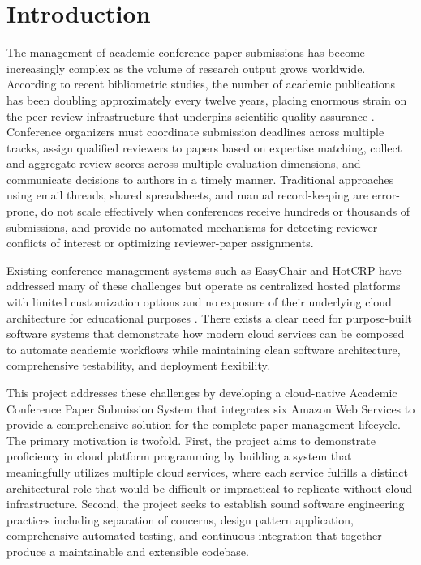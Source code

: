 \documentclass[conference]{IEEEtran}
\begin{document}
\section{Introduction}

The management of academic conference paper submissions has become increasingly complex as the volume of research output grows worldwide. According to recent bibliometric studies, the number of academic publications has been doubling approximately every twelve years, placing enormous strain on the peer review infrastructure that underpins scientific quality assurance \cite{bornmann2015growth}. Conference organizers must coordinate submission deadlines across multiple tracks, assign qualified reviewers to papers based on expertise matching, collect and aggregate review scores across multiple evaluation dimensions, and communicate decisions to authors in a timely manner. Traditional approaches using email threads, shared spreadsheets, and manual record-keeping are error-prone, do not scale effectively when conferences receive hundreds or thousands of submissions, and provide no automated mechanisms for detecting reviewer conflicts of interest or optimizing reviewer-paper assignments.

Existing conference management systems such as EasyChair and HotCRP have addressed many of these challenges but operate as centralized hosted platforms with limited customization options and no exposure of their underlying cloud architecture for educational purposes \cite{fowler2018}. There exists a clear need for purpose-built software systems that demonstrate how modern cloud services can be composed to automate academic workflows while maintaining clean software architecture, comprehensive testability, and deployment flexibility.

This project addresses these challenges by developing a cloud-native Academic Conference Paper Submission System that integrates six Amazon Web Services to provide a comprehensive solution for the complete paper management lifecycle. The primary motivation is twofold. First, the project aims to demonstrate proficiency in cloud platform programming by building a system that meaningfully utilizes multiple cloud services, where each service fulfills a distinct architectural role that would be difficult or impractical to replicate without cloud infrastructure. Second, the project seeks to establish sound software engineering practices including separation of concerns, design pattern application, comprehensive automated testing, and continuous integration that together produce a maintainable and extensible codebase.
\end{document}
